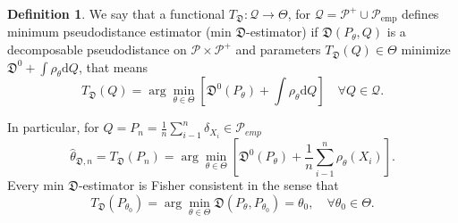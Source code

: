 \documentclass[11pt,a4paper]{article}
\theoremstyle{definition}
\newtheorem{definition}{Definition}[section]
\theoremstyle{theorem}
\begin{document}
\begin{definition}
	We say that a functional $T_\mathfrak{D}:\mathcal{Q} \rightarrow \Theta$, for $\mathcal{Q}=\mathcal{P}^+ \cup \mathcal{P}_{\text{emp}}$	defines minimum pseudodistance estimator (min $\mathfrak{D}$-estimator) if $\mathfrak{D}(P_\theta,Q)$ is a decomposable pseudodistance on $\mathcal{P}\times\mathcal{P}^+$ and parameters $T_\mathfrak{D}(Q) \in \Theta$ minimize $\mathfrak{D}^0 + \int{\rho_\theta}\mathrm{d}Q$, that means
	\begin{equation}
		T_\mathfrak{D}(Q) = \arg\min_{\theta \in \Theta} \left[ \mathfrak{D}^0(P_\theta) + \int{\rho_\theta}\mathrm{d}Q \right] \quad \forall Q \in \mathcal{Q}.
	\end{equation}
\end{definition}
In particular, for $Q = P_n = \frac{1}{n}\sum_{i-1}^n \delta_{X_i} \in \mathcal{P}_{emp}$
\begin{equation}
	\hat{\theta}_{\mathfrak{D},n} =T_\mathfrak{D}(P_n)  = \arg\min_{\theta \in \Theta}\left[ \mathfrak{D}^0(P_\theta) + \dfrac{1}{n} \sum_{i-1}^n \rho_\theta (X_i) \right].
\end{equation}
Every min $\mathfrak{D}$-estimator is Fisher consistent in the sense that 
\begin{equation}
	T_\mathfrak{D}(P_{\theta_0}) = \arg\min_{\theta \in \Theta} \mathfrak{D}(P_\theta, P_{\theta_0}) = \theta_0,\quad \forall \theta_0 \in \Theta.
\end{equation}
\end{document}
